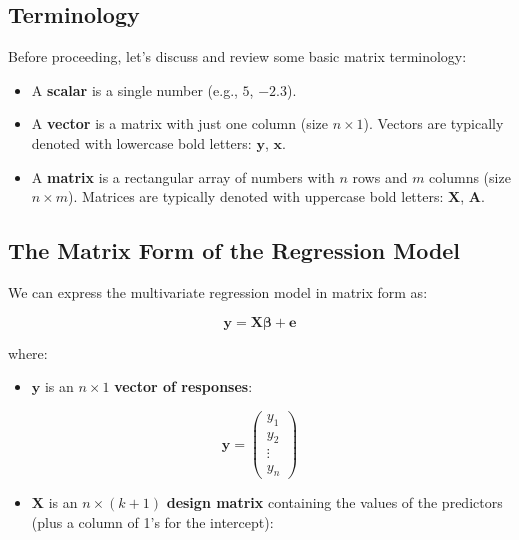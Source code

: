 \documentclass[
  letterpaper,
  DIV=11,
  numbers=noendperiod]{scrreprt}
\providecommand{\tightlist}{%
  \setlength{\itemsep}{0pt}\setlength{\parskip}{0pt}}
\begin{document}
\subsection{Terminology}\label{terminology}

Before proceeding, let's discuss and review some basic matrix
terminology:

\begin{itemize}
\item
  A \textbf{scalar} is a single number (e.g., \(5\), \(-2.3\)).
\item
  A \textbf{vector} is a matrix with just one column (size
  \(n \times 1\)). Vectors are typically denoted with lowercase bold
  letters: \(\mathbf{y}\), \(\mathbf{x}\).
\item
  A \textbf{matrix} is a rectangular array of numbers with \(n\) rows
  and \(m\) columns (size \(n \times m\)). Matrices are typically
  denoted with uppercase bold letters: \(\mathbf{X}\), \(\mathbf{A}\).
\end{itemize}

\subsection{The Matrix Form of the Regression
Model}\label{the-matrix-form-of-the-regression-model}

We can express the multivariate regression model in matrix form as:

\[
\mathbf{y} = \mathbf{X} \boldsymbol{\beta} + \mathbf{e}
\]

where:

\begin{itemize}
\tightlist
\item
  \(\mathbf{y}\) is an \(n \times 1\) \textbf{vector of responses}:
\end{itemize}

\[
\mathbf{y} = \begin{pmatrix} y_1 \\ y_2 \\ \vdots \\ y_n \end{pmatrix}
\]

\begin{itemize}
\tightlist
\item
  \(\mathbf{X}\) is an \(n \times (k+1)\) \textbf{design matrix}
  containing the values of the predictors (plus a column of 1's for the
  intercept):
\end{itemize}
\end{document}
